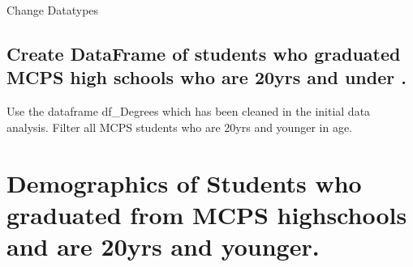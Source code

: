 \documentclass[]{article}
\newenvironment{Shaded}{\begin{snugshade}}{\end{snugshade}}
\newcommand{\CommentTok}[1]{\textcolor[rgb]{0.56,0.35,0.01}{\textit{#1}}}
\newcommand{\KeywordTok}[1]{\textcolor[rgb]{0.13,0.29,0.53}{\textbf{#1}}}
\newcommand{\NormalTok}[1]{#1}
\newcommand{\OperatorTok}[1]{\textcolor[rgb]{0.81,0.36,0.00}{\textbf{#1}}}
\newcommand{\StringTok}[1]{\textcolor[rgb]{0.31,0.60,0.02}{#1}}
\begin{document}
Change Datatypes

\begin{Shaded}
\end{Shaded}

\hypertarget{create-dataframe-of-students-who-graduated-mcps-high-schools-who-are-20yrs-and-under-.}{%
\subsection{Create DataFrame of students who graduated MCPS high schools
who are 20yrs and under
.}\label{create-dataframe-of-students-who-graduated-mcps-high-schools-who-are-20yrs-and-under-.}}

Use the dataframe df\_Degrees which has been cleaned in the initial data
analysis. Filter all MCPS students who are 20yrs and younger in age.

\begin{Shaded}
\end{Shaded}

\hypertarget{demographics-of-students-who-graduated-from-mcps-highschools-and-are-20yrs-and-younger.}{%
\section{Demographics of Students who graduated from MCPS highschools
and are 20yrs and
younger.}\label{demographics-of-students-who-graduated-from-mcps-highschools-and-are-20yrs-and-younger.}}
\end{document}
